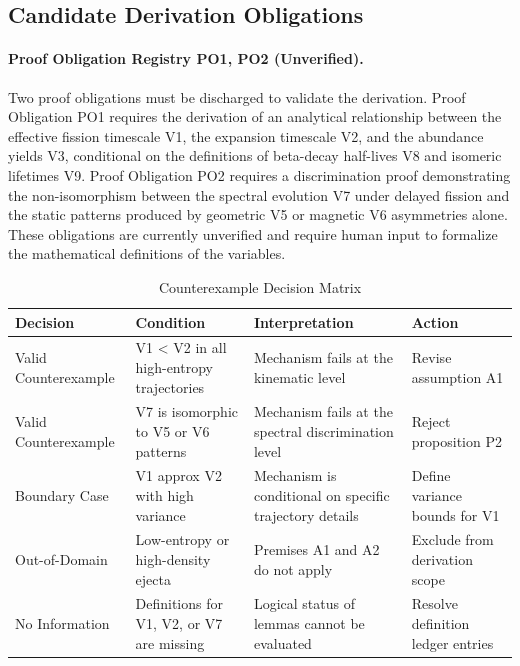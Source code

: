 \documentclass[conference]{IEEEtran}
\begin{document}
\subsection{Candidate Derivation Obligations}
\paragraph{Proof Obligation Registry PO1, PO2 (Unverified).} Two proof obligations must be discharged to validate the derivation. Proof Obligation PO1 requires the derivation of an analytical relationship between the effective fission timescale V1, the expansion timescale V2, and the abundance yields V3, conditional on the definitions of beta-decay half-lives V8 and isomeric lifetimes V9. Proof Obligation PO2 requires a discrimination proof demonstrating the non-isomorphism between the spectral evolution V7 under delayed fission and the static patterns produced by geometric V5 or magnetic V6 asymmetries alone. These obligations are currently unverified and require human input to formalize the mathematical definitions of the variables.

\begin{table}[htbp]
\centering
\footnotesize
\setlength{\tabcolsep}{3pt}
\renewcommand{\arraystretch}{1.12}
\caption{Counterexample Decision Matrix}
\label{tab:forward-derivation-and-counterexamples-b5}
\begin{tabular}{|p{}|p{}|p{}|p{}|}
\hline
Decision & Condition & Interpretation & Action \\\hline
Valid Counterexample & V1 < V2 in all high-entropy trajectories & Mechanism fails at the kinematic level & Revise assumption A1 \\\hline
Valid Counterexample & V7 is isomorphic to V5 or V6 patterns & Mechanism fails at the spectral discrimination level & Reject proposition P2 \\\hline
Boundary Case & V1 approx V2 with high variance & Mechanism is conditional on specific trajectory details & Define variance bounds for V1 \\\hline
Out-of-Domain & Low-entropy or high-density ejecta & Premises A1 and A2 do not apply & Exclude from derivation scope \\\hline
No Information & Definitions for V1, V2, or V7 are missing & Logical status of lemmas cannot be evaluated & Resolve definition ledger entries \\\hline
\end{tabular}
\end{table}
\end{document}
